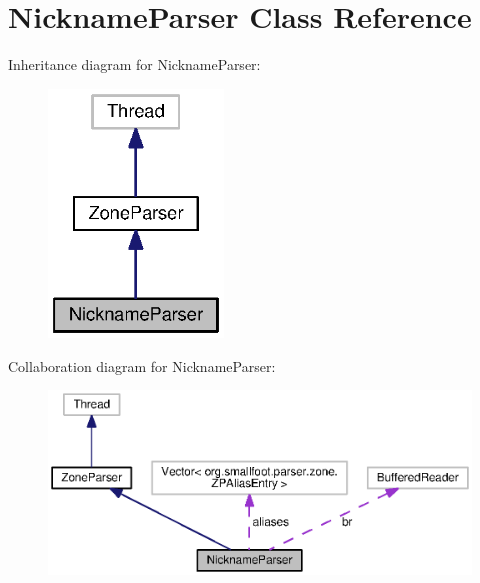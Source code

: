 \section{Nickname\-Parser Class Reference}
\label{classorg_1_1smallfoot_1_1parser_1_1zone_1_1NicknameParser}


Inheritance diagram for Nickname\-Parser\-:\nopagebreak
\begin{figure}[H]
\begin{center}
\leavevmode
\includegraphics[width=132pt]{classorg_1_1smallfoot_1_1parser_1_1zone_1_1NicknameParser__inherit__graph}
\end{center}
\end{figure}


Collaboration diagram for Nickname\-Parser\-:\nopagebreak
\begin{figure}[H]
\begin{center}
\leavevmode
\includegraphics[width=350pt]{classorg_1_1smallfoot_1_1parser_1_1zone_1_1NicknameParser__coll__graph}
\end{center}
\end{figure}
